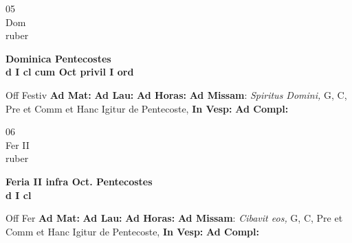 \documentclass[10pt, openany]{book}
\begin{document}
        \begin{center}
            \begin{minipage}{3.5in}
                \vspace{2em}
                \begin{minipage}{0.5in}
                    {\Huge 05} \\
                    {\normalsize Dom} \\
                    {\normalsize ruber}
                \end{minipage}
                \begin{minipage}{3.0in}
                    \textbf{ \large Dominica Pentecostes \\
                    \textnormal{\normalsize d I cl cum Oct privil I ord}} \\ 
                \end{minipage}
                \begin{justify}Off Festiv
                    \textbf{Ad Mat: }
                    \textbf{Ad Lau: }
                    \textbf{Ad Horas: }\textbf{Ad Missam}: \textit{Spiritus Domini,} G, C, Pre et Comm et Hanc Igitur de Pentecoste,  
                    \textbf{In Vesp: }
                    \textbf{Ad Compl: }
                \end{justify}
            \end{minipage}
        \end{center}
    
        \begin{center}
            \begin{minipage}{3.5in}
                \vspace{2em}
                \begin{minipage}{0.5in}
                    {\Huge 06} \\
                    {\normalsize Fer II} \\
                    {\normalsize ruber}
                \end{minipage}
                \begin{minipage}{3.0in}
                    \textbf{ \large Feria II infra Oct. Pentecostes \\
                    \textnormal{\normalsize d I cl}} \\ 
                \end{minipage}
                \begin{justify}Off Fer
                    \textbf{Ad Mat: }
                    \textbf{Ad Lau: }
                    \textbf{Ad Horas: }\textbf{Ad Missam}: \textit{Cibavit eos,} G, C, Pre et Comm et Hanc Igitur de Pentecoste,  
                    \textbf{In Vesp: }
                    \textbf{Ad Compl: }
                \end{justify}
            \end{minipage}
        \end{center}
    
\end{document}
